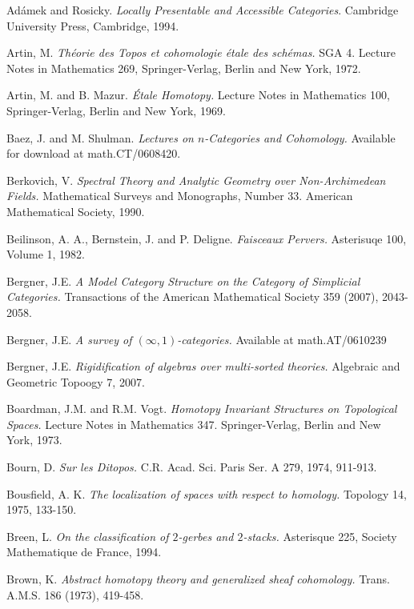 \documentclass[12pt, final]{report}
\theoremstyle{definition}
\begin{document}
\begin{thebibliography}{99}


 Ad\'{a}mek and Rosicky. {\it Locally Presentable
and Accessible Categories}. Cambridge University Press, Cambridge,
1994.

 Artin, M. {\it Th\'{e}orie des Topos et cohomologie
\'{e}tale des sch\'{e}mas.} SGA 4. Lecture Notes in Mathematics
269, Springer-Verlag, Berlin and New York, 1972.

 Artin, M. and B. Mazur. {\it \'{E}tale Homotopy.} Lecture Notes in Mathematics 100, Springer-Verlag, Berlin and New York, 1969.

 Baez, J. and M. Shulman. {\it Lectures on $n$-Categories and Cohomology.} Available for download at math.CT/0608420.

 Berkovich, V. {\it Spectral Theory and Analytic Geometry over Non-Archimedean Fields.} Mathematical Surveys and Monographs, Number 33. American Mathematical Society, 1990.

 Beilinson, A. A., Bernstein, J. and P. Deligne.
{\it Faisceaux Pervers.} Asterisuqe 100, Volume 1, 1982.

 Bergner, J.E. {\it A Model Category Structure on the Category of Simplicial Categories.} Transactions of the American Mathematical Society 359 (2007), 2043-2058.

 Bergner, J.E. {\it A survey of $(\infty,1)$-categories.} Available at math.AT/0610239

 Bergner, J.E. {\it Rigidification of algebras over multi-sorted theories.}
Algebraic and Geometric Topoogy 7, 2007.

 Boardman, J.M. and R.M. Vogt. {\it Homotopy
Invariant Structures on Topological Spaces.} Lecture Notes in
Mathematics 347. Springer-Verlag, Berlin and New York, 1973.

 Bourn, D. {\it Sur les Ditopos.} C.R. Acad.
Sci. Paris Ser. A 279, 1974, 911-913.

 Bousfield, A. K. {\it The localization of spaces
with respect to homology.} Topology 14, 1975, 133-150.

 Breen, L. {\it On the classification of $2$-gerbes and $2$-stacks.} Asterisque 225, Society Mathematique de France, 1994.

 Brown, K. {\it Abstract homotopy theory and generalized sheaf cohomology.} Trans. 
A.M.S. 186 (1973), 419-458. 


\end{thebibliography}
\end{document}
